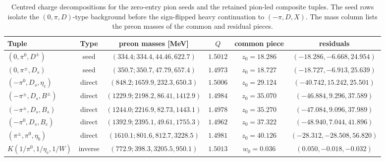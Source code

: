 \documentclass[11pt]{article}
\begin{document}
\begin{table}[h]
\centering
\scriptsize
\setlength{\tabcolsep}{3pt}
\begin{tabular}{@{}l c c c c c@{}}
\toprule
Tuple & Type & preon masses [MeV] & $Q$ & common piece & residuals \\
\midrule
$(0,\pi^0,D^\pm)$ & seed & $(334.4;334.4,44.46,622.7)$ & $1.5012$ & $z_0 = 18.286$ & $(-18.286,-6.668,24.954)$ \\
$(0,\pi^\pm,D_s)$ & seed & $(350.7;350.7,47.79,657.4)$ & $1.4973$ & $z_0 = 18.727$ & $(-18.727,-6.913,25.639)$ \\
$(-\pi^0,D_s,\eta_c)$ & direct & $(848.2;1659.9,232.3,650.3)$ & $1.5006$ & $z_0 = 29.124$ & $(-40.742,15.242,25.501)$ \\
$(-\pi^\pm,D_s,B^\pm)$ & direct & $(1229.9;2198.2,86.41,1412.9)$ & $1.4984$ & $z_0 = 35.070$ & $(-46.884,9.296,37.589)$ \\
$(-\pi^\pm,D_s,B_s)$ & direct & $(1244.0;2216.9,82.73,1443.1)$ & $1.4978$ & $z_0 = 35.270$ & $(-47.084,9.096,37.989)$ \\
$(-\pi^0,D_s,B_c)$ & direct & $(1392.9;2395.1,49.61,1755.3)$ & $1.4962$ & $z_0 = 37.322$ & $(-48.940,7.044,41.896)$ \\
$(\pi^\pm,\pi^0,\eta_b)$ & direct & $(1610.1;801.6,812.7,3228.5)$ & $1.4981$ & $z_0 = 40.126$ & $(-28.312,-28.508,56.820)$ \\
$K(1/\pi^0,1/\eta_c,1/W)$ & inverse & $(772.9;398.3,3205.5,950.1)$ & $1.5013$ & $w_0 = 0.036$ & $(0.050,-0.018,-0.032)$ \\
\bottomrule
\end{tabular}
\caption{Centred charge decompositions for the zero-entry pion seeds and the
  retained pion-led composite tuples.  The seed rows isolate the
  $(0,\pi,D)$-type background before the sign-flipped heavy continuation to
  $(-\pi,D,X)$.  The mass column lists the preon masses of the common and
  residual pieces.}
\end{table}
\end{document}
